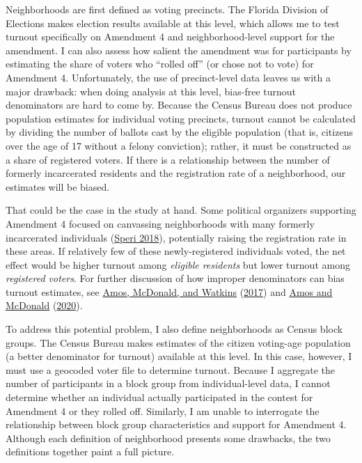 \documentclass[
  12pt,
]{article}
\begin{document}
Neighborhoods are first defined as voting precincts. The Florida Division of Elections makes election results available at this level, which allows me to test turnout specifically on Amendment 4 and neighborhood-level support for the amendment. I can also assess how salient the amendment was for participants by estimating the share of voters who ``rolled off'' (or chose not to vote) for Amendment 4. Unfortunately, the use of precinct-level data leaves us with a major drawback: when doing analysis at this level, bias-free turnout denominators are hard to come by. Because the Census Bureau does not produce population estimates for individual voting precincts, turnout cannot be calculated by dividing the number of ballots cast by the eligible population (that is, citizens over the age of 17 without a felony conviction); rather, it must be constructed as a share of registered voters. If there is a relationship between the number of formerly incarcerated residents and the registration rate of a neighborhood, our estimates will be biased.

That could be the case in the study at hand. Some political organizers supporting Amendment 4 focused on canvassing neighborhoods with many formerly incarcerated individuals (\protect\hyperlink{ref-Speri2018}{Speri 2018}), potentially raising the registration rate in these areas. If relatively few of these newly-registered individuals voted, the net effect would be higher turnout among \emph{eligible residents} but lower turnout among \emph{registered voters}. For further discussion of how improper denominators can bias turnout estimates, see \protect\hyperlink{ref-Amos2017}{Amos, McDonald, and Watkins} (\protect\hyperlink{ref-Amos2017}{2017}) and \protect\hyperlink{ref-Amos2020}{Amos and McDonald} (\protect\hyperlink{ref-Amos2020}{2020}).

To address this potential problem, I also define neighborhoods as Census block groups. The Census Bureau makes estimates of the citizen voting-age population (a better denominator for turnout) available at this level. In this case, however, I must use a geocoded voter file to determine turnout. Because I aggregate the number of participants in a block group from individual-level data, I cannot determine whether an individual actually participated in the contest for Amendment 4 or they rolled off. Similarly, I am unable to interrogate the relationship between block group characteristics and support for Amendment 4. Although each definition of neighborhood presents some drawbacks, the two definitions together paint a full picture.
\end{document}
